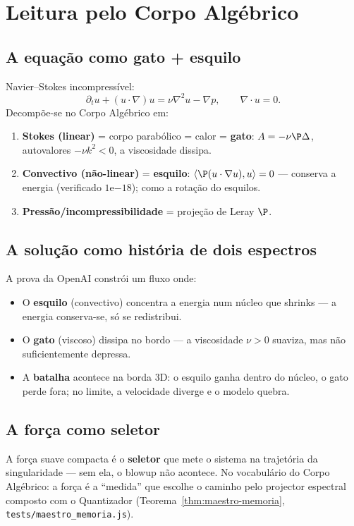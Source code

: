 \documentclass[11pt,a4paper]{article}
\newcommand\code[1]{\texttt{\small #1}}
\begin{document}
\section{Leitura pelo Corpo Algébrico}\label{sec:leitura}

\subsection{A equação como gato + esquilo}
Navier--Stokes incompressível:
\begin{equation}\label{eq:NS}
\partial_t u+(u\cdot\nabla)u=\nu\nabla^2 u-\nabla p,\qquad
\nabla\cdot u=0.
\end{equation}
Decompõe-se no Corpo Algébrico em:
\begin{enumerate}
\item \textbf{Stokes (linear)} = corpo parabólico = calor = \textbf{gato}:
  $A=-\nu\P\Delta$, autovalores $-\nu k^2<0$, a viscosidade dissipa.
\item \textbf{Convectivo (não-linear)} = \textbf{esquilo}:
  $\langle\P(u\cdot\nabla u),u\rangle=0$ --- conserva a energia
  (verificado $1$e$-18$); como a rotação do esquilos.
\item \textbf{Pressão/incompressibilidade} = projeção de Leray $\P$.
\end{enumerate}

\subsection{A solução como história de dois espectros}
A prova da OpenAI constrói um fluxo onde:
\begin{itemize}
\item O \textbf{esquilo} (convectivo) concentra a energia num núcleo
  que shrinks --- a energia conserva-se, só se redistribui.
\item O \textbf{gato} (viscoso) dissipa no bordo --- a viscosidade
  $\nu>0$ suaviza, mas não suficientemente depressa.
\item A \textbf{batalha} acontece na borda 3D: o esquilo ganha
  dentro do núcleo, o gato perde fora; no limite, a velocidade
  diverge e o modelo quebra.
\end{itemize}

\subsection{A força como seletor}
A força suave compacta é o \textbf{seletor} que mete o sistema
na trajetória da singularidade --- sem ela, o blowup não acontece.
No vocabulário do Corpo Algébrico: a força é a ``medida'' que
escolhe o caminho pelo projector espectral composto com o
Quantizador (Teorema~\ref{thm:maestro-memoria},
\code{tests/maestro\_memoria.js}).
\end{document}
